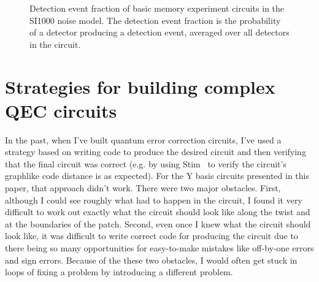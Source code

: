 \documentclass[onecolumn,unpublished,a4paper]{quantumarticle}
\theoremstyle{definition}
\theoremstyle{definition}
\theoremstyle{definition}
\begin{document}
\begin{figure}
    \centering
    \caption{
        Detection event fraction of basic memory experiment circuits in the SI1000 noise model.
        The detection event fraction is the probability of a detector producing a detection event, averaged over all detectors in the circuit.
    }
    \label{fig:det_frac}
\end{figure}


\section{Strategies for building complex QEC circuits}
\label{app:the_struggle}

In the past, when I've built quantum error correction circuits, I've used a strategy based on writing code to produce the desired circuit and then verifying that the final circuit was correct (e.g. by using Stim~\cite{gidney2021stim} to verify the circuit's graphlike code distance is as expected).
For the Y basis circuits presented in this paper, that approach didn't work.
There were two major obstacles.
First, although I could see roughly what had to happen in the circuit, I found it very difficult to work out exactly what the circuit should look like along the twist and at the boundaries of the patch.
Second, even once I knew what the circuit should look like, it was difficult to write correct code for producing the circuit due to there being so many opportunities for easy-to-make mistakes like off-by-one errors and sign errors.
Because of the these two obstacles, I would often get stuck in loops of fixing a problem by introducing a different problem.
\end{document}
